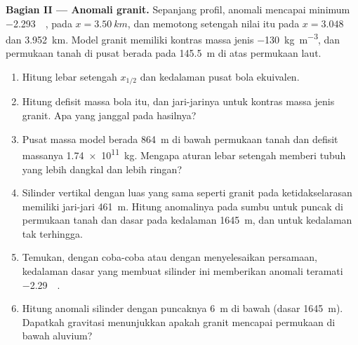\begin{problem}
\medskip\noindent\textbf{Bagian II --- Anomali granit.} Sepanjang
profil, anomali mencapai minimum \qty{-2.293}{\milli\gal}, pada
$x = \qty{3.50}{km}$, dan memotong setengah nilai itu pada $x = 3.048$ dan
\qty{3.952}{km}. Model granit memiliki kontras massa jenis
\qty{-130}{kg.m^{-3}}, dan permukaan tanah di pusat berada pada \qty{145.5}{m}
di atas permukaan laut.
\begin{enumerate}[resume]
\item Hitung lebar setengah $x_{1/2}$ dan kedalaman pusat
  bola ekuivalen.
\item Hitung defisit massa bola itu, dan jari-jarinya untuk
  kontras massa jenis granit. Apa yang janggal pada hasilnya?
\item Pusat massa model berada \qty{864}{m} di bawah permukaan tanah dan
  defisit massanya \qty{1.74e11}{kg}. Mengapa aturan lebar setengah memberi
  tubuh yang lebih dangkal dan lebih ringan?
\item Silinder vertikal dengan luas yang sama seperti granit pada
  ketidakselarasan memiliki jari-jari \qty{461}{m}. Hitung anomalinya pada sumbu
  untuk puncak di permukaan tanah dan dasar pada kedalaman \qty{1645}{m}, dan untuk
  kedalaman tak terhingga.
\item Temukan, dengan coba-coba atau dengan menyelesaikan persamaan, kedalaman dasar yang membuat silinder ini
  memberikan anomali teramati \qty{-2.29}{\milli\gal}.
\item Hitung anomali silinder dengan puncaknya \qty{6}{m} di bawah
  (dasar \qty{1645}{m}). Dapatkah gravitasi menunjukkan apakah granit mencapai
  permukaan di bawah aluvium?
\end{enumerate}


\end{problem}
